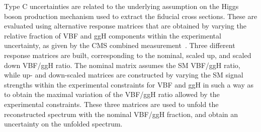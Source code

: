 Type C uncertainties are related to the underlying assumption on the Higgs boson production mechanism used to extract the fiducial cross sections. These are evaluated using alternative response matrices that are obtained by varying the relative fraction of VBF and ggH components within the experimental uncertainty, as given by the CMS combined measurement~\cite{Khachatryan:2014jba}.
Three different response matrices are built, corresponding to the nominal, scaled up, and scaled down
VBF/ggH ratio. The nominal matrix assumes the SM VBF/ggH ratio, %
while up- and down-scaled matrices are constructed by varying the SM signal strengths within the
experimental constraints for VBF and ggH in such a way as to obtain the
maximal variation of the VBF/ggH ratio allowed by the experimental
constraints.
These three matrices are used to unfold the reconstructed spectrum with the nominal VBF/ggH fraction, and obtain an uncertainty on the unfolded spectrum.


